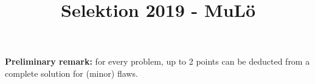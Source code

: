 \documentclass[language=german,style=solution]{smo}
\title{Selektion 2019 - MuLö}
\begin{document}
\bigskip

\textbf{Preliminary remark:} for every problem, up to 2 points can be deducted from a complete solution for (minor) flaws.

\bigskip

\begin{enumerate}[label=\textbf{\arabic*.}]


\end{enumerate}

\bigskip

\vfill
\end{document}
